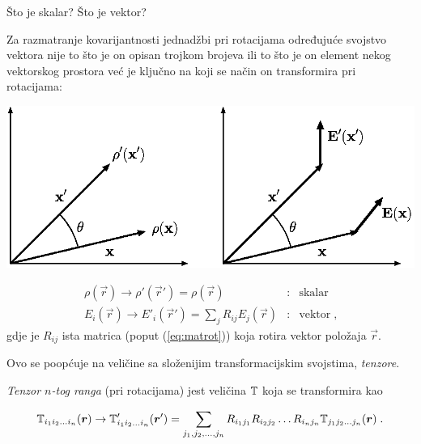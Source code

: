  Što je skalar? Što je vektor?

Za razmatranje kovarijantnosti jednadžbi pri rotacijama određujuće svojstvo 
vektora nije to što je on opisan trojkom brojeva ili 
to što je on element nekog vektorskog prostora već je ključno na koji
se način on transformira pri rotacijama:

\vspace*{2ex}
\centerline{\includegraphics[scale=0.8]{pics/skalarvektor.eps}}

\begin{eqnarray*}
 \rho(\vec{r}) \to \rho'(\vec{r}') = \rho(\vec{r}) & : & \textrm{skalar} \\
  E_i(\vec{r}) \to E'_i(\vec{r}') = \sum_j R_{ij}E_j(\vec{r})
   & : & \textrm{vektor} \;,
\end{eqnarray*}
gdje je $R_{ij}$ ista matrica (poput (\ref{eq:matrot})) koja rotira
vektor položaja $\vec{r}$.

  Ovo se poopćuje na veličine sa složenijim transformacijskim svojstima,
\emph{tenzore}. 

\begin{definicija}
\label{def:tenzor}

\emph{Tenzor $n$-tog ranga} (pri rotacijama)  jest veličina $\mathbb{T}$  koja
se transformira kao

\begin{displaymath}
 \bbtensor{T}_{i_1 i_2 \ldots i_n}(\vec{r}) \to \bbtensor{T}'_{i_1 i_2 \ldots i_n}(\vec{r}') =
\sum_{j_1, j_2, \ldots, j_n}
  R_{i_1 j_1}  R_{i_2 j_2} \ldots  R_{i_n j_n} \bbtensor{T}_{j_1 j_2 \ldots j_n}(\vec{r})
 \; . 
\end{displaymath}
\end{definicija}


